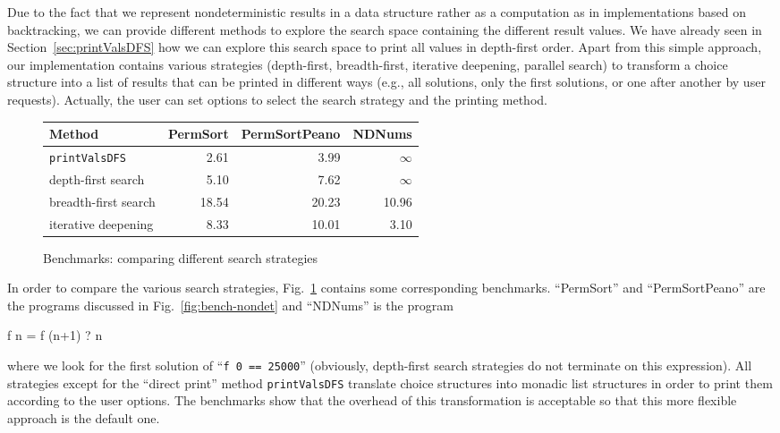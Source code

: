 \documentclass{llncs}
\newcommand{\code}[1]{\mbox{\small\texttt{#1}}}
\newcommand{\ccode}[1]{``\code{#1}''}
\begin{document}
Due to the fact that we represent nondeterministic results
in a data structure rather as a computation as in implementations
based on backtracking, we can provide different methods to
explore the search space containing the different result values.
We have already seen in Section~\ref{sec:printValsDFS}
how we can explore this search space to print all values in
depth-first order.
Apart from this simple approach,
our implementation contains various strategies
(depth-first, breadth-first, iterative deepening, parallel search)
to transform a choice structure into a list of results
that can be printed in different ways (e.g., all solutions, only the first
solutions, or one after another by user requests).
Actually, the user can set options to select the search strategy and
the printing method.

\begin{figure}
\centering
\begin{tabular}{|@{~~}l@{~~}|*{3}{@{~~}r@{~~}|}}
\hline
Method               & PermSort & PermSortPeano &  NDNums \\\hline
\code{printValsDFS}  &    2.61  &         3.99  & $\infty$ \\
depth-first search   &    5.10  &         7.62  & $\infty$ \\
breadth-first search &   18.54  &        20.23  &    10.96 \\
iterative deepening  &    8.33  &        10.01  &     3.10 \\
\hline
\end{tabular}
\caption{Benchmarks: comparing different search strategies}
 \label{fig:search-strategies}
\end{figure}
%
In order to compare the various search strategies,
Fig.~\ref{fig:search-strategies} contains some corresponding
benchmarks.
``PermSort'' and ``PermSortPeano'' are the programs
discussed in Fig.~\ref{fig:bench-nondet} and ``NDNums'' is the program
\begin{curry}
  f n = f (n+1) ? n
\end{curry}
where we look for the first solution of \ccode{f 0 == 25000}
(obviously, depth-first search strategies do not terminate on this
expression).
All strategies except for the ``direct print'' method \code{printValsDFS}
translate choice structures into monadic list structures
in order to print them according to the user options.
The benchmarks show that the overhead of this transformation
is acceptable so that this more flexible approach is the default one.
\end{document}
